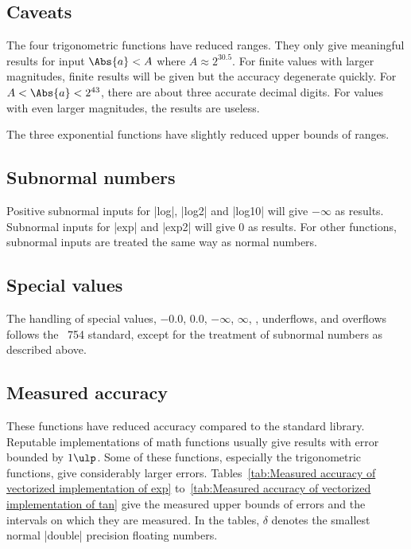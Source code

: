 \subsection{Caveats}
\label{sub:Caveats}

The four trigonometric functions have reduced ranges. They only give meaningful
results for input $\Abs{a} < A$ where $A \approx 2^{30.5}$. For finite values
with larger magnitudes, finite results will be given but the accuracy
degenerate quickly. For $A < \Abs{a} < 2^{43}$, there are about three accurate
decimal digits. For values with even larger magnitudes, the results are
useless.

The three exponential functions have slightly reduced upper bounds of ranges.

\subsection{Subnormal numbers}
\label{sub:Subnormal numbers}

Positive subnormal inputs for |log|, |log2| and |log10| will give $-\infty$ as
results. Subnormal inputs for |exp| and |exp2| will give $0$ as results. For
other functions, subnormal inputs are treated the same way as normal numbers.

\subsection{Special values}
\label{sub:Special values}

The handling of special values, $-0.0$, $0.0$, $-\infty$, $\infty$, \nan,
underflows, and overflows follows the \ieee~754 standard, except for the
treatment of subnormal numbers as described above.

\subsection{Measured accuracy}
\label{sub:Measured accuracy}

These functions have reduced accuracy compared to the standard library.
Reputable implementations of math functions usually give results with error
bounded by $1\ulp$. Some of these functions, especially the trigonometric
functions, give considerably larger errors. Tables~\ref{tab:Measured accuracy
  of vectorized implementation of exp} to~\ref{tab:Measured accuracy of
  vectorized implementation of tan} give the measured upper bounds of errors
and the intervals on which they are measured. In the tables, $\delta$ denotes
the smallest normal |double| precision floating numbers.

